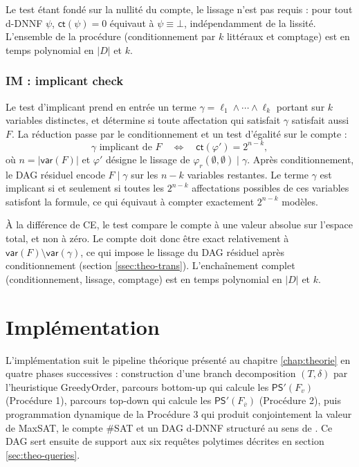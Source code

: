 \documentclass[11pt,a4paper]{report}
\theoremstyle{plain}
\theoremstyle{definition}
\begin{document}
Le test étant fondé sur la nullité du compte, le lissage n'est pas
requis : pour tout d-DNNF $\psi$, $\mathsf{ct}(\psi) = 0$ équivaut à
$\psi \equiv \bot$, indépendamment de la lissité. L'ensemble de la
procédure (conditionnement par $k$ littéraux et comptage) est en
temps polynomial en $|D|$ et $k$.

\subsection{IM : implicant check}
\label{ssec:theo-im}

Le test d'implicant prend en entrée un terme
$\gamma = \ell_1 \wedge \cdots \wedge \ell_k$ portant sur $k$ variables
distinctes, et détermine si toute affectation qui satisfait $\gamma$
satisfait aussi $F$. La réduction passe par le conditionnement et un
test d'égalité sur le compte :
\[
  \gamma \text{ implicant de } F
  \quad \Longleftrightarrow \quad
  \mathsf{ct}(\varphi') = 2^{n-k},
\]
où $n = |\mathsf{var}(F)|$ et $\varphi'$ désigne le lissage de
$\varphi_r(\emptyset, \emptyset) \mid \gamma$. Après conditionnement,
le DAG résiduel encode $F \mid \gamma$ sur les $n - k$ variables
restantes. Le terme $\gamma$ est implicant si et seulement si toutes
les $2^{n - k}$ affectations possibles de ces variables satisfont la
formule, ce qui équivaut à compter exactement $2^{n - k}$ modèles.

À la différence de CE, le test compare le compte à une valeur absolue
sur l'espace total, et non à zéro. Le compte doit donc être exact
relativement à $\mathsf{var}(F) \setminus \mathsf{var}(\gamma)$, ce qui
impose le lissage du DAG résiduel après conditionnement
(section \ref{ssec:theo-trans}). L'enchaînement complet
(conditionnement, lissage, comptage) est en temps polynomial en $|D|$
et $k$.

\chapter{Implémentation}
\label{chap:implementation}


L'implémentation suit le pipeline théorique présenté au
chapitre \ref{chap:theorie} en quatre phases successives : construction
d'une branch decomposition $(T, \delta)$ par l'heuristique GreedyOrder,
parcours bottom-up qui calcule les $\mathsf{PS}'(F_v)$ (Procédure 1),
parcours top-down qui calcule les $\mathsf{PS}'(F_{\overline{v}})$
(Procédure 2), puis programmation dynamique de la Procédure 3 qui
produit conjointement la valeur de MaxSAT, le compte \#SAT et un
DAG d-DNNF structuré au sens de \cite{bova2015}. Ce DAG sert ensuite de
support aux six requêtes polytimes décrites en
section \ref{sec:theo-queries}.
\end{document}
